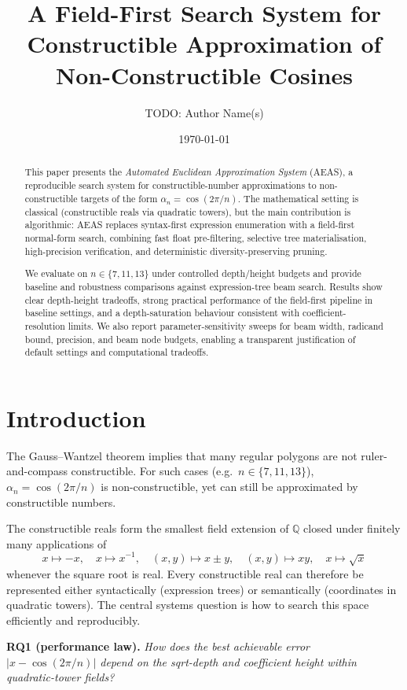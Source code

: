 \documentclass[11pt]{article}
\title{A Field-First Search System for Constructible Approximation of Non-Constructible Cosines}
\author{TODO: Author Name(s)}
\date{\today}
\begin{document}
\maketitle

\begin{abstract}
This paper presents the \emph{Automated Euclidean Approximation System} (AEAS), a reproducible search system for constructible-number approximations to non-constructible targets of the form $\alpha_n=\cos(2\pi/n)$.
The mathematical setting is classical (constructible reals via quadratic towers), but the main contribution is algorithmic: AEAS replaces syntax-first expression enumeration with a field-first normal-form search, combining fast float pre-filtering, selective tree materialisation, high-precision verification, and deterministic diversity-preserving pruning.

We evaluate on $n\in\{7,11,13\}$ under controlled depth/height budgets and provide baseline and robustness comparisons against expression-tree beam search.
Results show clear depth-height tradeoffs, strong practical performance of the field-first pipeline in baseline settings, and a depth-saturation behaviour consistent with coefficient-resolution limits.
We also report parameter-sensitivity sweeps for beam width, radicand bound, precision, and beam node budgets, enabling a transparent justification of default settings and computational tradeoffs.
\end{abstract}

\section{Introduction}

The Gauss--Wantzel theorem implies that many regular polygons are not ruler-and-compass constructible.
For such cases (e.g.\ $n\in\{7,11,13\}$), $\alpha_n=\cos(2\pi/n)$ is non-constructible, yet can still be approximated by constructible numbers.

The constructible reals form the smallest field extension of $\mathbb{Q}$ closed under finitely many applications of
\[
  x \mapsto -x, \quad x \mapsto x^{-1}, \quad (x,y) \mapsto x \pm y, \quad (x,y) \mapsto xy, \quad x \mapsto \sqrt{x}
\]
whenever the square root is real.
Every constructible real can therefore be represented either syntactically (expression trees) or semantically (coordinates in quadratic towers).
The central systems question is how to search this space efficiently and reproducibly.

\medskip
\noindent\textbf{RQ1 (performance law).}
\emph{How does the best achievable error $|x - \cos(2\pi/n)|$ depend on the sqrt-depth and coefficient height within quadratic-tower fields?}
\end{document}
